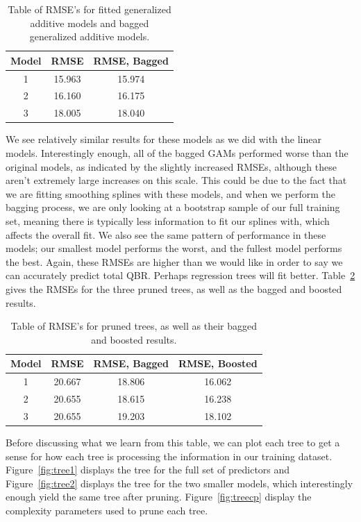 \documentclass[12pt]{article}\usepackage[]{graphicx}\usepackage[]{color}
\begin{document}
\begin{table}[h]
\centering
\begin{tabular}{|c|c|c|}
\hline
Model & RMSE & RMSE, Bagged \\
\hline
1 & 15.963 & 15.974 \\
\hline
2 & 16.160 & 16.175 \\
\hline
3 & 18.005 & 18.040 \\
\hline
\end{tabular}
\captionsetup{font=footnotesize,labelfont=footnotesize}
\caption{\label{tab:gamres} Table of RMSE's for fitted generalized additive models and bagged generalized additive models.}
\end{table}

We see relatively similar results for these models as we did with the linear models. Interestingly enough, all of the bagged GAMs performed worse than the original models, as indicated by the slightly increased RMSEs, although these aren't extremely large increases on this scale. This could be due to the fact that we are fitting smoothing splines with these models, and when we perform the bagging process, we are only looking at a bootstrap sample of our full training set, meaning there is typically less information to fit our splines with, which affects the overall fit. We also see the same pattern of performance in these models; our smallest model performs the worst, and the fullest model performs the best. Again, these RMSEs are higher than we would like in order to say we can accurately predict total QBR. Perhaps regression trees will fit better. Table~\ref{tab:treeres} gives the RMSEs for the three pruned trees, as well as the bagged and boosted results.

\begin{table}[h]
\centering
\begin{tabular}{|c|c|c|c|}
\hline
Model & RMSE & RMSE, Bagged & RMSE, Boosted \\
\hline
1 & 20.667 & 18.806 & 16.062\\
\hline
2 & 20.655 & 18.615 & 16.238\\
\hline
3 & 20.655 & 19.203 & 18.102\\
\hline
\end{tabular}
\captionsetup{font=footnotesize,labelfont=footnotesize}
\caption{\label{tab:treeres} Table of RMSE's for pruned trees, as well as their bagged and boosted results.}
\end{table}

Before discussing what we learn from this table, we can plot each tree to get a sense for how each tree is processing the information in our training dataset. Figure~\ref{fig:tree1} displays the tree for the full set of predictors and Figure~\ref{fig:tree2} displays the tree for the two smaller models, which interestingly enough yield the same tree after pruning. Figure~\ref{fig:treecp} display the complexity parameters used to prune each tree.\\
\newpage
\end{document}
